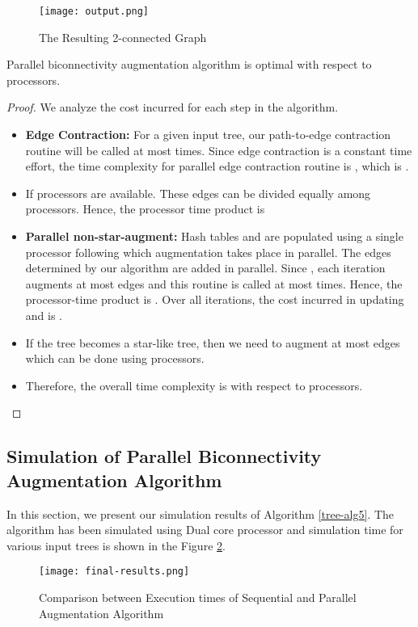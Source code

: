 \documentclass[runningheads]{llncs}
\begin{document}
\begin{figure}[htpb]
\begin{center}
\texttt{[image: output.png]}
\caption {The Resulting 2-connected Graph}   \label{fig:out}
\end{center}
\end{figure}
\begin{lemma}
Parallel biconnectivity augmentation algorithm is optimal with respect to  processors. 
\end{lemma}
\begin{proof}
We analyze the cost incurred for each step in the algorithm.  
\begin{itemize}
\item {\bf Edge Contraction:} For a given input tree, our path-to-edge contraction routine will be called at most  times.  Since edge contraction is a constant time effort, the time complexity for parallel edge contraction routine is , which is .
\item If  processors are available.  These edges can be divided equally among  processors. Hence, the processor time product is 
\item {\bf Parallel non-star-augment:} Hash tables  and  are populated using a single processor following which augmentation takes place in parallel. The  edges determined by our algorithm are added in parallel.  Since , each iteration augments at most  edges and this routine is called at most  times.  Hence, the processor-time product is .  Over all iterations, the cost incurred in updating  and  is .
\item If the tree becomes a star-like tree, then we need to augment at most  edges which can be done using  processors.
\item Therefore, the overall time complexity is  with respect to  processors.
\end{itemize}
\end{proof}
\subsection{Simulation of Parallel Biconnectivity Augmentation Algorithm}
In this section, we present our simulation results of Algorithm \ref{tree-alg5}.  The algorithm has been simulated using Dual core processor and simulation time for various input trees is shown in the Figure \ref{simulation}.
\begin{figure}[htpb]
\begin{center}
\texttt{[image: final-results.png]}
\caption{Comparison between Execution times of Sequential and Parallel Augmentation Algorithm} \label{simulation}
\end{center}
\end{figure}
\end{document}
